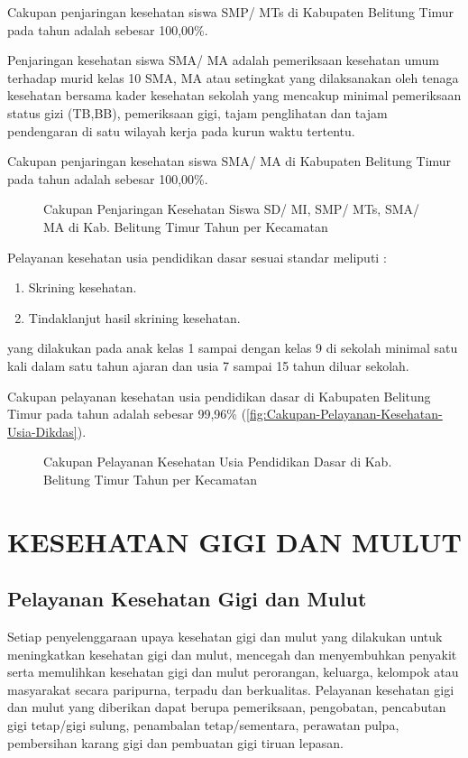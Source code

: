 Cakupan penjaringan kesehatan siswa SMP/ MTs di Kabupaten Belitung Timur pada tahun \tP adalah sebesar 100,00\%.

Penjaringan kesehatan siswa SMA/ MA adalah pemeriksaan kesehatan umum terhadap murid kelas 10 SMA, MA atau setingkat yang dilaksanakan oleh tenaga kesehatan bersama kader kesehatan sekolah yang mencakup minimal pemeriksaan status gizi (TB,BB), pemeriksaan gigi, tajam penglihatan dan tajam pendengaran di satu wilayah kerja pada kurun waktu tertentu.

Cakupan penjaringan kesehatan siswa SMA/ MA di Kabupaten Belitung Timur pada tahun \tP adalah sebesar 100,00\%.

\begin{figure}[H]
    \centering
    \caption{Cakupan Penjaringan Kesehatan Siswa SD/ MI, SMP/ MTs, SMA/ MA di Kab. Belitung Timur Tahun \tP per Kecamatan}
    \label{fig:Cakupan-Penjaringan-Siswa}
\end{figure}

Pelayanan kesehatan usia pendidikan dasar sesuai standar meliputi :
\begin{enumerate}
    \item Skrining kesehatan.
    \item Tindaklanjut hasil skrining kesehatan.
\end{enumerate}
yang dilakukan pada anak kelas 1 sampai dengan kelas 9 di sekolah minimal satu kali dalam satu tahun ajaran dan usia 7 sampai 15 tahun diluar sekolah.

Cakupan pelayanan kesehatan usia pendidikan dasar di Kabupaten Belitung Timur pada tahun \tP adalah sebesar 99,96\% (\autoref{fig:Cakupan-Pelayanan-Kesehatan-Usia-Dikdas}).

\begin{figure}[H]
    \centering
    \caption{Cakupan Pelayanan Kesehatan Usia Pendidikan Dasar di Kab. Belitung Timur Tahun \tP per Kecamatan}
    \label{fig:Cakupan-Pelayanan-Kesehatan-Usia-Dikdas}
\end{figure}

\section{KESEHATAN GIGI DAN MULUT}
\subsection{Pelayanan Kesehatan Gigi dan Mulut}
Setiap penyelenggaraan upaya kesehatan gigi dan mulut yang dilakukan untuk meningkatkan kesehatan gigi dan mulut, mencegah dan menyembuhkan penyakit serta memulihkan kesehatan gigi dan mulut perorangan, keluarga, kelompok atau masyarakat secara paripurna, terpadu dan berkualitas.
Pelayanan kesehatan gigi dan mulut yang diberikan dapat berupa pemeriksaan, pengobatan, pencabutan gigi tetap/gigi sulung, penambalan tetap/sementara, perawatan pulpa, pembersihan karang gigi dan pembuatan gigi tiruan lepasan.

